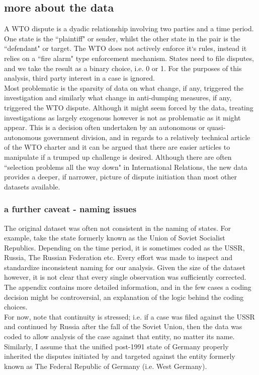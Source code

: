 \documentclass[]{article}
\begin{document}
\subsection{more about the data}
A WTO dispute is a dyadic relationship involving two parties and a time period. One state is the ``plaintiff" or sender, whilst the other state in the pair is the ``defendant" or target. The WTO does not actively enforce it`s rules, instead it relies on a ``fire alarm" type enforcement mechanism. States need to file disputes, and we take the result as a binary choice, i.e. 0 or 1. For the purposes of this analysis, third party interest in a case is ignored.  \\

Most problematic is the sparsity of data on what change, if any, triggered the investigation and similarly what change in anti-dumping measures, if any, triggered the WTO dispute. Although it might seem forced by the data, treating investigations as largely exogenous however is not as problematic as it might appear. This is a decision often undertaken by an autonomous or quasi-autonomous government division, and in regards to a relatively technical article of the WTO charter and it can be argued that there are easier articles to manipulate if a trumped up challenge is desired.  Although there are often ``selection problems all the way down" in International Relations, the new data provides a deeper, if narrower, picture of dispute initiation than most other datasets available. 

\subsubsection{a further caveat - naming issues}
The original dataset was often not consistent in the naming of states. For example, take the state formerly known as the Union of Soviet Socialist Republics. Depending on the time period, it is sometimes coded as the USSR, Russia, The Russian Federation etc. Every effort was made to inspect and standardize inconsistent naming for our analysis.  Given the size of the dataset however, it is not clear that every single observation was sufficiently corrected. The appendix contains more detailed information, and in the few cases a coding decision might be controversial, an explanation of the logic behind the coding choices. \\

For now, note that continuity is stressed; i.e. if a case was filed against the USSR and continued by Russia after the fall of the Soviet Union, then the data was coded to allow analysis of the case against that entity, no matter its name. Similarly, I assume that the unified post-1991 state of Germany properly inherited the disputes initiated by and targeted against the entity formerly known as The Federal Republic of Germany (i.e. West Germany).
\end{document}
